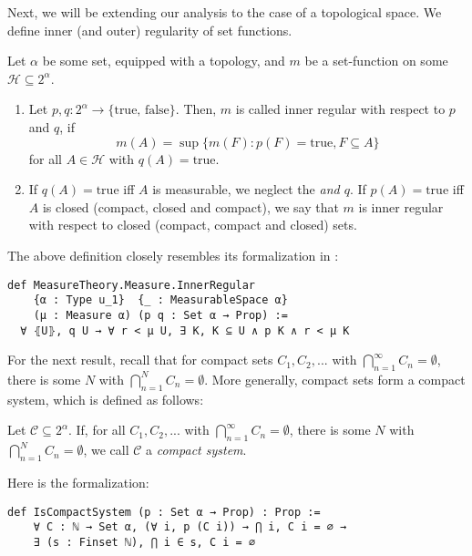 \documentclass[lean]{DraftAFM}
\begin{document}
\noindent
Next, we will be extending our analysis to the case of a topological
space. We define inner (and outer) regularity of set functions.

\begin{definition} \label{def:innerreg}
  Let $\alpha$ be some set, equipped with a topology, and $m$ be a
  set-function on some $\mathcal H \subseteq 2^\alpha$.
  \begin{enumerate}
  \item Let $p, q : 2^\alpha \to \{\text{true, false}\}$. Then, $m$ is
    called inner regular with respect to $p$ and $q$, if
    $$ m(A) = \sup\{m(F) : p(F) = \text{true}, F \subseteq A\}$$ for
    all $A \in \mathcal H$ with $q(A) = \text{true}$.
  \item If $q(A) = \text{true}$ iff $A$ is measurable, we neglect the
    {\em and $q$}. If $p(A) = \text{true}$ iff $A$ is closed (compact,
    closed and compact), we say that $m$ is inner regular with respect
    to closed (compact, compact and closed) sets.
  \end{enumerate}
\end{definition}

\noindent
The above definition closely resembles its formalization in
:

\begin{verbatim}
def MeasureTheory.Measure.InnerRegular
    {α : Type u_1}  {_ : MeasurableSpace α}
    (μ : Measure α) (p q : Set α → Prop) :=
  ∀ ⦃U⦄, q U → ∀ r < μ U, ∃ K, K ⊆ U ∧ p K ∧ r < μ K
\end{verbatim}

For the next result, recall that for compact sets $C_1, C_2,...$ with
$\bigcap_{n=1}^\infty C_n = \emptyset$, there is some $N$ with
$\bigcap_{n=1}^N C_n = \emptyset$. More generally, compact sets form a
compact system, which is defined as follows:

\begin{definition}
  Let $\mathcal C \subseteq 2^\alpha$. If, for all $C_1, C_2,...$ with
  $\bigcap_{n=1}^\infty C_n = \emptyset$, there is some $N$ with
  $\bigcap_{n=1}^N C_n = \emptyset$, we call $\mathcal C$ a {\em
    compact system}.
\end{definition}

\noindent
Here is the formalization:

\begin{verbatim}
def IsCompactSystem (p : Set α → Prop) : Prop :=
    ∀ C : ℕ → Set α, (∀ i, p (C i)) → ⋂ i, C i = ∅ →
    ∃ (s : Finset ℕ), ⋂ i ∈ s, C i = ∅
\end{verbatim}
\end{document}

